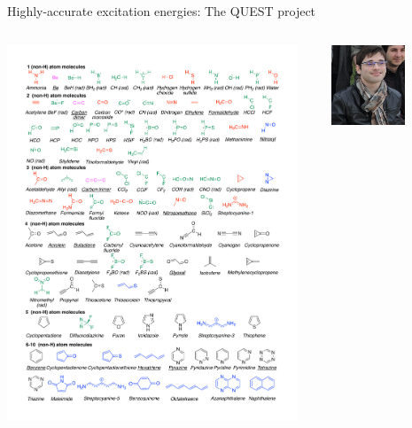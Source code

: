\documentclass[aspectratio=169,9pt]{beamer}
\begin{document}
\begin{frame}{Highly-accurate excitation energies: The QUEST project}
\begin{columns}
\begin{column}{0.40\textwidth}
                        \includegraphics[width=0.95\textwidth]{fig/QUEST_mol}
                \end{column}
                \begin{column}{0.20\textwidth}
                        \centering
                        \small
                        \includegraphics[width=0.6\textwidth]{fig/Mika}

\end{column}
\end{columns}
\end{frame}
\end{document}
